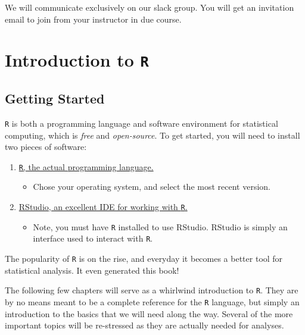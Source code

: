 \documentclass[]{book}
\providecommand{\tightlist}{%
  \setlength{\itemsep}{0pt}\setlength{\parskip}{0pt}}
\begin{document}
We will communicate exclusively on our slack group. You will get an invitation email to join from your instructor in due course.

\hypertarget{R-intro}{%
\chapter{\texorpdfstring{Introduction to \texttt{R}}{Introduction to R}}\label{R-intro}}

\hypertarget{getting-started}{%
\section{Getting Started}\label{getting-started}}

\texttt{R} is both a programming language and software environment for statistical computing, which is \emph{free} and \emph{open-source}. To get started, you will need to install two pieces of software:

\begin{enumerate}
\def\labelenumi{\arabic{enumi}.}
\tightlist
\item
  \href{https://www.r-project.org}{\texttt{R}, the actual programming language.}

  \begin{itemize}
  \tightlist
  \item
    Chose your operating system, and select the most recent version.
  \end{itemize}
\item
  \href{http://www.rstudio.com/}{RStudio, an excellent IDE for working with \texttt{R}.}

  \begin{itemize}
  \tightlist
  \item
    Note, you must have \texttt{R} installed to use RStudio. RStudio is simply an interface used to interact with \texttt{R}.
  \end{itemize}
\end{enumerate}

The popularity of \texttt{R} is on the rise, and everyday it becomes a better tool for statistical analysis. It even generated this book!

The following few chapters will serve as a whirlwind introduction to \texttt{R}. They are by no means meant to be a complete reference for the \texttt{R} language, but simply an introduction to the basics that we will need along the way. Several of the more important topics will be re-stressed as they are actually needed for analyses.
\end{document}
